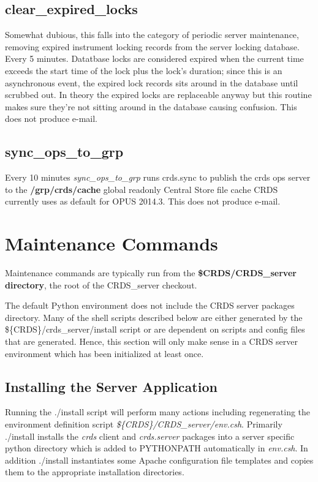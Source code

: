 \documentclass[letterpaper,10pt,english]{sphinxmanual}
\begin{document}
\section{clear\_expired\_locks}
\label{server_guide:clear-expired-locks}
Somewhat dubious,  this falls into the category of periodic server maintenance,  removing expired instrument locking
records from the server locking database.   Every 5 minutes.  Datatbase locks are considered expired when the current
time exceeds the start time of the lock plus the lock's duration;  since this is an asynchronous event,  the expired
lock records sits around in the database until scrubbed out.   In theory the expired locks are replaceable anyway
but this  routine makes sure they're not sitting around in the database causing confusion.  This does not produce e-mail.


\section{sync\_ops\_to\_grp}
\label{server_guide:sync-ops-to-grp}
Every 10 minutes \emph{sync\_ops\_to\_grp} runs crds.sync to publish the crds ops server to the \textbf{/grp/crds/cache} global readonly
Central Store file cache CRDS currently uses as default for OPUS 2014.3.   This does not produce e-mail.


\chapter{Maintenance Commands}
\label{server_guide:maintenance-commands}
Maintenance commands are typically run from the \textbf{\$CRDS/CRDS\_server directory},  the root of the CRDS\_server checkout.

The default Python environment does not include the CRDS server packages directory.   Many of the shell scripts
described below are either generated by the \$\{CRDS\}/crds\_server/install script or are dependent on scripts and
config files that are generated.   Hence, this section will only make sense in a CRDS server environment which has
been initialized at least once.


\section{Installing the Server Application}
\label{server_guide:installing-the-server-application}
Running the ./install script will perform many actions including regenerating the environment definition script
\emph{\$\{CRDS\}/CRDS\_server/env.csh}.  Primarily ./install installs the \emph{crds} client and \emph{crds.server} packages into
a server specific python directory which is added to PYTHONPATH automatically in \emph{env.csh}.  In addition ./install
instantiates some Apache configuration file templates and copies them to the appropriate installation directories.
\end{document}
